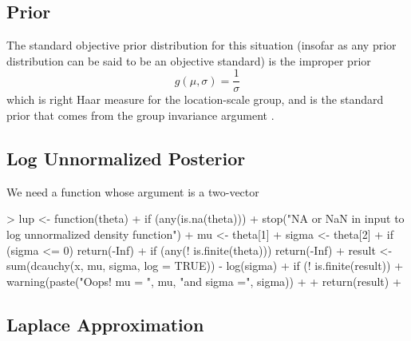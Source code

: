 \documentclass{article}
\begin{document}
\subsection{Prior}

The standard objective prior distribution for this situation
(insofar as any prior distribution can be said to be an objective standard)
is the improper prior
$$
   g(\mu, \sigma) = \frac{1}{\sigma}
$$
which is right Haar measure for the location-scale group, and is the
standard prior that comes from the group invariance argument
\citep[Section~3.2]{kass-wasserman}.

\subsection{Log Unnormalized Posterior}

We need a function whose argument is a two-vector
\begin{Schunk}
\begin{Sinput}
> lup <- function(theta) {
+     if (any(is.na(theta)))
+         stop("NA or NaN in input to log unnormalized density function")
+     mu <- theta[1]
+     sigma <- theta[2]
+     if (sigma <= 0) return(-Inf)
+     if (any(! is.finite(theta))) return(-Inf)
+     result <- sum(dcauchy(x, mu, sigma, log = TRUE)) - log(sigma)
+     if (! is.finite(result)) {
+         warning(paste("Oops!  mu = ", mu, "and sigma =", sigma))
+     }
+     return(result)
+ }
\end{Sinput}
\end{Schunk}

\subsection{Laplace Approximation}
\end{document}
